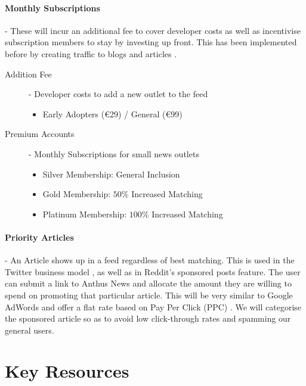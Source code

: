 \documentclass[11pt]{article}
\begin{document}
\paragraph{Monthly Subscriptions} - These will incur an additional fee to cover developer costs as well as incentivise subscription members to stay by investing up front. This has been implemented before by creating traffic to blogs and articles \cite{bloggeries}.

\begin{description}
\item[Addition Fee] -	Developer costs to add a new outlet to the feed
\begin{itemize}
\item Early Adopters (\euro{}29) / General (\euro{}99)
\end{itemize}

\item[Premium Accounts] - Monthly Subscriptions for small news outlets
\begin{itemize}
\item Silver Membership: General Inclusion
\item Gold Membership:		\(50\%\) Increased Matching
\item Platinum Membership:	\(100\%\) Increased Matching
\end{itemize}


\end{description}

\paragraph{Priority Articles} - An Article shows up in a feed regardless of best matching. This is used in the Twitter business model \cite{twitter_model}, as well as in Reddit's sponsored posts feature. The user can submit a link to Anthus News and allocate the amount they are willing to spend on promoting that particular article. This will be very similar to Google AdWords \cite{adwords} and offer a flat rate based on Pay Per Click (PPC) \cite{wordstream}. We will categorise the sponsored article so as to avoid low click-through rates and spamming our general users.

\section{Key Resources}
\end{document}
